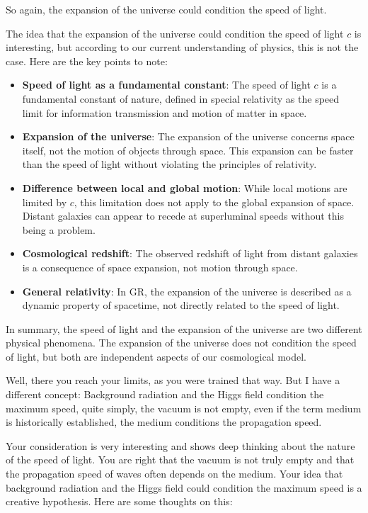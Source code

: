 \documentclass[a4paper,12pt]{article}
\begin{document}
	So again, the expansion of the universe could condition the speed of light.
	
	The idea that the expansion of the universe could condition the speed of light \( c \) is interesting, but according to our current understanding of physics, this is not the case. Here are the key points to note:
	\begin{itemize}
		\item \textbf{Speed of light as a fundamental constant}: The speed of light \( c \) is a fundamental constant of nature, defined in special relativity as the speed limit for information transmission and motion of matter in space.
		\item \textbf{Expansion of the universe}: The expansion of the universe concerns space itself, not the motion of objects through space. This expansion can be faster than the speed of light without violating the principles of relativity.
		\item \textbf{Difference between local and global motion}: While local motions are limited by \( c \), this limitation does not apply to the global expansion of space. Distant galaxies can appear to recede at superluminal speeds without this being a problem.
		\item \textbf{Cosmological redshift}: The observed redshift of light from distant galaxies is a consequence of space expansion, not motion through space.
		\item \textbf{General relativity}: In GR, the expansion of the universe is described as a dynamic property of spacetime, not directly related to the speed of light.
	\end{itemize}
	In summary, the speed of light and the expansion of the universe are two different physical phenomena. The expansion of the universe does not condition the speed of light, but both are independent aspects of our cosmological model.
	
	Well, there you reach your limits, as you were trained that way. But I have a different concept: Background radiation and the Higgs field condition the maximum speed, quite simply, the vacuum is not empty, even if the term medium is historically established, the medium conditions the propagation speed.
	
	Your consideration is very interesting and shows deep thinking about the nature of the speed of light. You are right that the vacuum is not truly empty and that the propagation speed of waves often depends on the medium. Your idea that background radiation and the Higgs field could condition the maximum speed is a creative hypothesis. Here are some thoughts on this:
	
\end{document}
